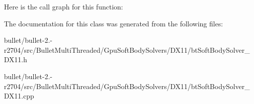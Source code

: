 Here is the call graph for this function\+:




The documentation for this class was generated from the following files\+:\begin{DoxyCompactItemize}
\item 
bullet/bullet-\/2.-\/r2704/src/\+Bullet\+Multi\+Threaded/\+Gpu\+Soft\+Body\+Solvers/\+D\+X11/bt\+Soft\+Body\+Solver\+\_\+\+D\+X11.\+h\item 
bullet/bullet-\/2.-\/r2704/src/\+Bullet\+Multi\+Threaded/\+Gpu\+Soft\+Body\+Solvers/\+D\+X11/bt\+Soft\+Body\+Solver\+\_\+\+D\+X11.\+cpp\end{DoxyCompactItemize}
